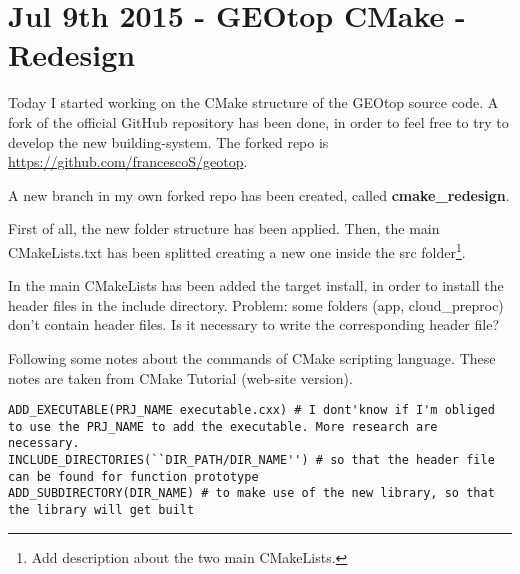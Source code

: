 \section{Jul 9th 2015 - GEOtop CMake - Redesign}\label{sec:20150709}

Today I started working on the CMake structure of the GEOtop source
code. A fork of the official GitHub repository has been done, in order
to feel free to try to develop the new building-system. The forked
repo is \url{https://github.com/francescoS/geotop}.

A new branch in my own forked repo has been created, called
\textbf{cmake\_redesign}.

First of all, the new folder structure has been applied. Then, the
main CMakeLists.txt has been splitted creating a new one inside the
src folder\footnote{Add description about the two main CMakeLists.}.

In the main CMakeLists has been added the target install, in order to
install the header files in the include directory. Problem: some
folders (app, cloud\_preproc) don't contain header files. Is it
necessary to write the corresponding header file?

Following some notes about the commands of CMake scripting
language. These notes are taken from CMake Tutorial (web-site
version).

\begin{fullwidth}
  \begin{lstlisting}[style=cmakeStyle]
ADD_EXECUTABLE(PRJ_NAME executable.cxx) # I dont'know if I'm obliged to use the PRJ_NAME to add the executable. More research are necessary.
INCLUDE_DIRECTORIES(``DIR_PATH/DIR_NAME'') # so that the header file can be found for function prototype
ADD_SUBDIRECTORY(DIR_NAME) # to make use of the new library, so that the library will get built
  \end{lstlisting}
\end{fullwidth}
